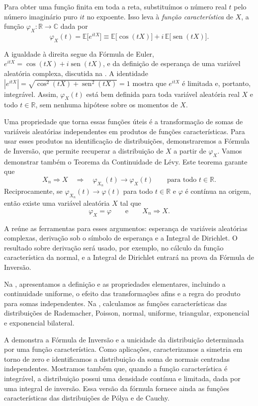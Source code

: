 \documentclass[12pt,portuguese]{article}
\theoremstyle{definition}
\theoremstyle{plainexercise}
\theoremstyle{starredexercise}
\theoremstyle{definition}
\renewcommand{\sin}{\operatorname{sen}}
\begin{document}
Para obter uma função finita em toda a reta, substituímos o número real $t$
pelo número imaginário puro $it$ no expoente. Isso leva à \emph{função
característica} de $X$, a função $\varphi_{X}:\mathbb{R}\to\mathbb{C}$ dada por
\[
\varphi_{X}(t)
=
\mathbb{E}\bigl[e^{itX}\bigr] 
\equiv 
\mathbb{E}\bigl[\cos(tX)\bigr]+ i\, \mathbb{E}\bigl[\sin(tX)\bigr].
\]

A igualdade à direita segue da Fórmula de Euler,
$e^{itX}=\cos(tX)+i\sin(tX)$, e da definição de esperança de uma variável
aleatória complexa, discutida na . A identidade
$|e^{itX}|=\sqrt{\cos^2(tX)+\sin^2(tX)}=1$ mostra que $e^{itX}$ é limitada
e, portanto, integrável. Assim, $\varphi_{X}(t)$ está bem definida para toda
variável aleatória real $X$ e todo $t\in\mathbb{R}$, sem nenhuma hipótese
sobre os momentos de $X$.

Uma propriedade que torna essas funções úteis é a transformação de somas de
variáveis aleatórias independentes em produtos de funções características.
Para usar esses produtos na identificação de distribuições, demonstraremos a
Fórmula de Inversão, que permite recuperar a distribuição de $X$ a partir de
$\varphi_X$. Vamos demonstrar também o Teorema da Continuidade
de Lévy. Este teorema garante que
\[
X_n\Rightarrow X
\quad\Longrightarrow\quad
\varphi_{X_n}(t)\longrightarrow\varphi_X(t)
\qquad\text{para todo }t\in\mathbb{R}.
\]
Reciprocamente, se $\varphi_{X_n}(t)\to\varphi(t)$ para todo
$t\in\mathbb{R}$ e $\varphi$ é contínua na origem, então existe uma variável
aleatória $X$ tal que
\[
\varphi_X=\varphi
\qquad\text{e}\qquad
X_n\Rightarrow X.
\]

A  reúne as ferramentas para esses argumentos:
esperança de variáveis aleatórias complexas, derivação sob o símbolo de
esperança e a Integral de Dirichlet. O resultado sobre derivação será usado,
por exemplo, no cálculo da função característica da normal, e a Integral de
Dirichlet entrará na prova da Fórmula de Inversão.

Na , apresentamos a definição e as propriedades
elementares, incluindo a continuidade uniforme, o efeito das transformações
afins e a regra do produto para somas independentes. Na
, calculamos as funções características das distribuições
de Rademacher, Poisson, normal, uniforme, triangular, exponencial e
exponencial bilateral.

A  demonstra a Fórmula de Inversão e a unicidade da
distribuição determinada por uma função característica. Como aplicações,
caracterizamos a simetria em torno de zero e identificamos a distribuição da
soma de normais centradas independentes. Mostramos também que, quando a
função característica é integrável, a distribuição possui uma densidade
contínua e limitada, dada por uma integral de inversão. Essa versão da
fórmula fornece ainda as funções características das distribuições de Pólya
e de Cauchy.
\end{document}
